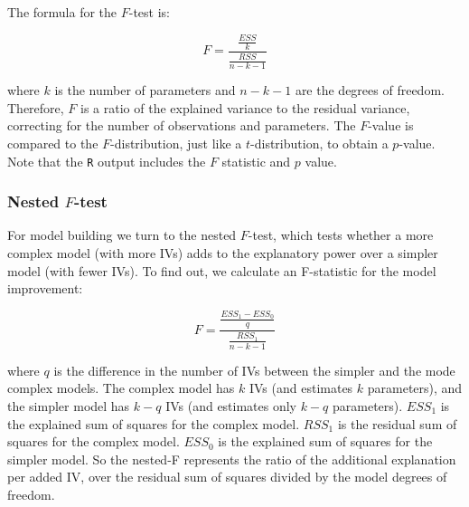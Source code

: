\documentclass[11pt,openany]{book}\usepackage[]{graphicx}\usepackage[]{color}
\begin{document}
{The formula for the $F$-test is: 

\begin{equation}
  F = \frac{\frac{ESS}{k}}{\frac{RSS}{n-k-1}}
\end{equation}

\noindent where $k$ is the number of parameters and $n-k-1$ are the degrees of freedom. Therefore, $F$ is a ratio of the explained variance to the residual variance, correcting for the number of observations and parameters. The $F$-value is compared to the $F$-distribution, just like a $t$-distribution, to obtain a $p$-value. Note that the \texttt{R} output includes the $F$ statistic and $p$ value. 

\subsubsection{Nested $F$-test}

For model building we turn to the nested $F$-test, which tests whether a more complex model (with more IVs) adds to the explanatory power over a simpler model (with fewer IVs). To find out, we calculate an F-statistic for the model improvement: 

\begin{equation}
  F = \frac{\frac{ESS_1-ESS_0}{q}}{\frac{RSS_1}{n-k-1}}
\end{equation}

\noindent where $q$ is the difference in the number of IVs between the simpler and the mode complex models.  The complex model has $k$ IVs (and estimates $k$ parameters), and the simpler model has $k-q$ IVs (and estimates only $k-q$ parameters). $ESS_1$ is the explained sum of squares
for the complex model. $RSS_1$ is the residual sum of squares for the complex model. $ESS_0$ is the explained sum of squares for the simpler
model. So the nested-F represents the ratio of the additional explanation per added IV, over the residual sum of squares divided by the model degrees of freedom.

}
\end{document}
